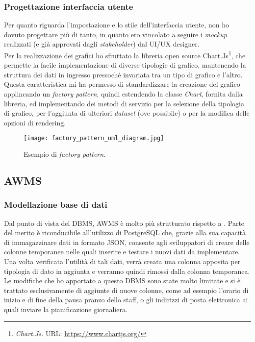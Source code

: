 \subsubsection{Progettazione interfaccia utente}
Per quanto riguarda l'impostazione e lo stile dell'interfaccia utente, non ho dovuto progettare più di tanto, in quanto ero vincolato a seguire i \textit{mockup} realizzati (e già approvati dagli \textit{stakeholder}) dal UI/UX designer.\\
Per la realizzazione dei grafici ho sfruttato la libreria open source Chart.Js\footnote{\textit{Chart.Js.} URL: \href{https://www.chartjs.org/}{https://www.chartjs.org/}}, che permette la facile implementazione di diverse tipologie di grafico, mantenendo la struttura dei dati in ingresso pressoché invariata tra un tipo di grafico e l'altro. 
Questa caratteristica mi ha permesso di standardizzare la creazione del grafico applincando un \textit{factory pattern}, quindi estendendo la classe \textit{Chart}, fornita dalla libreria, ed implementando dei metodi di servizio per la selezione della tipologia di grafico, per l'aggiunta di ulteriori \textit{dataset} (ove possibile) o per la modifica delle opzioni di rendering.
\begin{figure}[h]
\texttt{[image: factory\_pattern\_uml\_diagram.jpg]}
\centering
\caption{Esempio di \textit{factory pattern}.}
\label{fig:factory-pattern}
\end{figure}


\subsection{AWMS}
\subsubsection{Modellazione base di dati}
Dal punto di vista del DBMS, AWMS è molto più strutturato rispetto a \DS{}. Parte del merito è riconducibile all'utilizzo di PostgreSQL che, grazie alla sua capacità di immagazzinare dati in formato JSON, consente agli sviluppatori di creare delle colonne temporanee nelle quali inserire e testare i nuovi dati da implementare. Una volta verificata l'utilità di tali dati, verrà creata una colonna apposita per tipologia di dato in aggiunta e verranno quindi rimossi dalla colonna temporanea.\\
Le modifiche che ho apportato a questo DBMS sono state molto limitate e si è trattato esclusivamente di aggiunte di nuove colonne, come ad esempio l'orario di inizio e di fine della pausa pranzo dello staff, o gli indirizzi di posta elettronica ai quali inviare la pianificazione giornaliera.  
